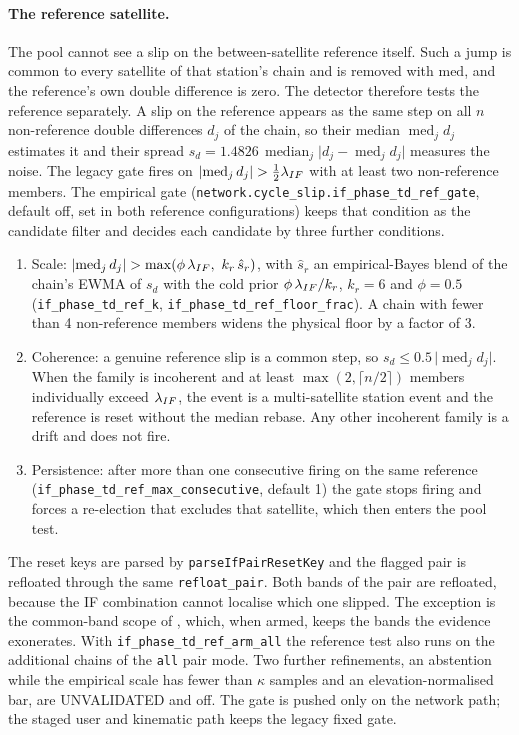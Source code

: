 \documentclass[main.tex]{subfiles}
\begin{document}
\paragraph{The reference satellite.}
The pool cannot see a slip on the between-satellite reference itself.
Such a jump is common to every satellite of that station's chain and is
removed with $\mathrm{med}$, and the reference's own double difference is
zero.  The detector therefore tests the reference separately.  A slip on
the reference appears as the same step on all $n$ non-reference double
differences $d_j$ of the chain, so their median $\operatorname{med}_j d_j$
estimates it and their spread
$s_d = 1.4826\,\operatorname{median}_j\lvert d_j - \operatorname{med}_j d_j\rvert$
measures the noise.  The legacy gate fires on
$\lvert\operatorname{med}_j d_j\rvert > \tfrac12\lambda_{IF}$ with at least two
non-reference members.  The empirical gate
(\texttt{network.cycle\_slip.if\_phase\_td\_ref\_gate}, default off, set in
both reference configurations) keeps that condition as the candidate filter
and decides each candidate by three further conditions.
\begin{enumerate}[leftmargin=*, itemsep=0pt]
\item Scale:
  $\lvert\operatorname{med}_j d_j\rvert > \max(\phi\,\lambda_{IF},\ k_r\,\hat s_r)$,
  with $\hat s_r$ an empirical-Bayes blend of the chain's EWMA of $s_d$ with
  the cold prior $\phi\,\lambda_{IF}/k_r$, $k_r = 6$ and $\phi = 0.5$
  (\texttt{if\_phase\_td\_ref\_k}, \texttt{if\_phase\_td\_ref\_floor\_frac}).
  A chain with fewer than 4 non-reference members widens the physical floor
  by a factor of 3.
\item Coherence: a genuine reference slip is a common step, so
  $s_d \le 0.5\,\lvert\operatorname{med}_j d_j\rvert$.  When the family is
  incoherent and at least $\max(2,\lceil n/2\rceil)$ members individually
  exceed $\lambda_{IF}$, the event is a multi-satellite station event and the
  reference is reset without the median rebase.  Any other incoherent
  family is a drift and does not fire.
\item Persistence: after more than one consecutive firing on the same
  reference (\texttt{if\_phase\_td\_ref\_max\_consecutive}, default 1) the
  gate stops firing and forces a re-election that excludes that satellite,
  which then enters the pool test.
\end{enumerate}
The reset keys are parsed by \texttt{parseIfPairResetKey} and the flagged
pair is refloated through the same \texttt{refloat\_pair}.  Both bands of
the pair are refloated, because the IF combination cannot localise which one
slipped.  The exception is the common-band scope of
, which, when armed, keeps the bands the evidence
exonerates.  With \texttt{if\_phase\_td\_ref\_arm\_all} the reference test
also runs on the additional chains of the \texttt{all} pair mode.  Two
further refinements, an abstention while the empirical scale has fewer than
$\kappa$ samples and an elevation-normalised bar, are UNVALIDATED and off.
The gate is pushed only on the network path; the staged user and kinematic
path keeps the legacy fixed gate.
\end{document}
